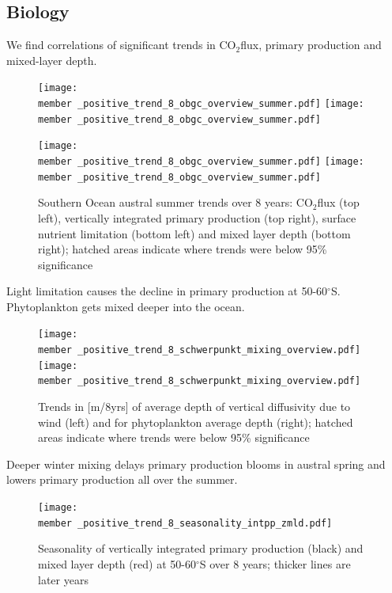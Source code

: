 \documentclass[aspectratio=169]{beamer}
\newcommand{\member}{m178_1985_1992} %
\begin{document}
	
\subsection*{Biology}
\begin{frame}{We find correlations of significant trends in CO$_2$flux, primary production and mixed-layer depth.}
	
	\begin{figure}
		\centering
		\vspace{-2mm}
		\texttt{[image: \\member \_positive\_trend\_8\_obgc\_overview\_summer.pdf]} %
\texttt{[image: \\member \_positive\_trend\_8\_obgc\_overview\_summer.pdf]} %

\texttt{[image: \\member \_positive\_trend\_8\_obgc\_overview\_summer.pdf]} %
\texttt{[image: \\member \_positive\_trend\_8\_obgc\_overview\_summer.pdf]} %
\caption{Southern Ocean austral summer trends over 8 years: CO$_2$flux (top left), vertically integrated primary production (top right), surface nutrient limitation (bottom left) and mixed layer depth (bottom right); hatched areas indicate where trends were below 95\% significance}
\label{fig:co2flux_intpp}
	\end{figure}
\end{frame}	

\begin{frame}{Light limitation causes the decline in primary production at 50-60$^\circ$S. Phytoplankton gets mixed deeper into the ocean.} %

	\begin{figure}
		\centering
		\texttt{[image: \\member \_positive\_trend\_8\_schwerpunkt\_mixing\_overview.pdf]} 
		\texttt{[image: \\member \_positive\_trend\_8\_schwerpunkt\_mixing\_overview.pdf]}
\caption{Trends in [m/8yrs] of average depth of vertical diffusivity due to wind (left) and for phytoplankton average depth (right); hatched areas indicate where trends were below 95\% significance}
\label{fig:wind_mixing}
	\end{figure}
	
\end{frame}


\begin{frame}{Deeper winter mixing delays primary production blooms in austral spring and lowers primary production all over the summer.}
	\begin{figure}[h]
		\centering
		\texttt{[image: \\member \_positive\_trend\_8\_seasonality\_intpp\_zmld.pdf]} %
		\caption{Seasonality of vertically integrated primary production (black) and mixed layer depth (red) at 50-60$^\circ$S over 8 years; thicker lines are later years}
		\label{fig:zmld_intpp_seasonality}
	\end{figure}
	
\end{frame}
\end{document}
